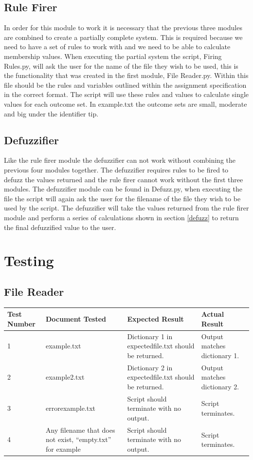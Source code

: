 \documentclass{article}
\begin{document}
\subsection{Rule Firer}
In order for this module to work it is necessary that the previous three modules are combined to create a partially complete system. This is required because we need to have a set of rules to work with and we need to be able to calculate membership values. When executing the partial system the script, Firing Rules.py, will ask the user for the name of the file they wish to be used, this is the functionality that was created in the first module, File Reader.py. Within this file should be the rules and variables outlined within the assignment specification in the correct format. The script will use these rules and values to calculate single values for each outcome set. In example.txt the outcome sets are small, moderate and big under the identifier tip.

\subsection{Defuzzifier}
Like the rule firer module the defuzzifier can not work without combining the previous four modules together. The defuzzifier requires rules to be fired to defuzz the values returned and the rule firer cannot work without the first three modules. The defuzzifier module can be found in Defuzz.py, when executing the file the script will again ask the user for the filename of the file they wish to be used by the script. The defuzzifier will take the values returned from the rule firer module and perform a series of calculations shown  in section \ref{defuzz} to return the final defuzzified value to the user.

\section{Testing}
\subsection{File Reader}
\begin{center}
 \begin{tabular}{ |p{2cm}||p{3cm}|p{3cm}|p{3cm}|  }
 \hline
 Test Number & Document Tested & Expected Result & Actual Result \\ [0.5ex] 
 \hline\hline
 1 & example.txt & Dictionary 1 in expectedfile.txt should be returned. & Output matches dictionary 1. \\ 
 \hline
 2 & example2.txt & Dictionary 2 in expectedfile.txt should be returned. & Output matches dictionary 2. \\
 \hline
 3 & errorexample.txt & Script should terminate with no output. & Script terminates. \\
 \hline
 4 & Any filename that does not exist, “empty.txt” for example & Script should terminate with no output. & Script terminates. \\
 \hline
\end{tabular}
\end{center}
\end{document}
